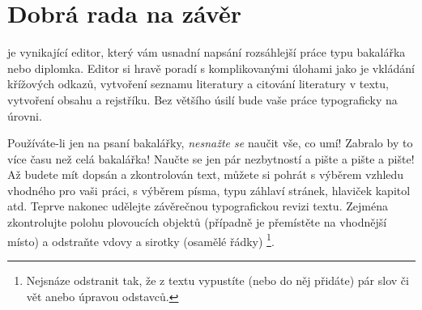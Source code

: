
\chapter[Závěr ]{Dobrá rada na závěr}

\LyX{} je vynikající editor, který vám usnadní napsání rozsáhlejší
práce typu bakalářka nebo diplomka. Editor si hravě poradí s komplikovanými
úlohami jako je vkládání křížových odkazů, vytvoření seznamu literatury
a citování literatury v textu, vytvoření obsahu a rejstříku. Bez většího
úsilí bude vaše práce  typograficky na úrovni.

Používáte-li %
\marginpar{\textbf{\Huge !}%
}\LyX{} jen na psaní bakalářky, \emph{nesnažte se} naučit vše, co umí!
Zabralo by to více času než celá bakalářka! Naučte se jen pár nezbytností
a pište a pište a pište! Až budete mít dopsán a zkontrolován text,
můžete si pohrát s výběrem vzhledu vhodného pro vaši práci, s výběrem
písma, typu záhlaví stránek, hlaviček kapitol atd. Teprve nakonec
udělejte závěrečnou typografickou revizi textu. Zejména zkontrolujte
polohu plovoucích objektů (případně je přemístěte na vhodnější místo)
a odstraňte vdovy a sirotky (osamělé řádky)%
\footnote{Nejsnáze odstranit tak, že z textu vypustíte (nebo do něj přidáte)
pár slov či vět anebo úpravou odstavců.%
}.
